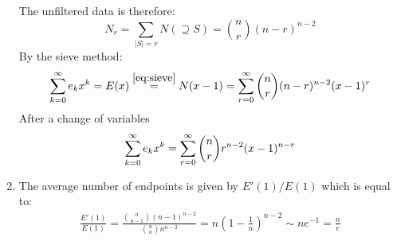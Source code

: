 \begin{solution}
\begin{enumerate}[label=(\alph*)]
        The unfiltered data is therefore:
        \[
            N_r = \sum_{|S| = r} N(\supseteq S) = \binom{n}{r} (n-r)^{n-2}
        \]
        By the sieve method:
        \[
            \bsum[k]  e_k x^k = E(x) \estep{\eqref{eq:sieve}} N(x-1) = \bsum[r] \binom{n}{r} (n-r)^{n-2}(x-1)^r
        \]
        After a change of variables
        \[
            \bsum[k]  e_k x^k = \bsum[r] \binom{n}{r} r^{n-2}(x-1)^{n-r}
        \]
        \item The average number of endpoints is given by $E'(1) / E(1)$ which is equal to:
        \begin{align*}
            \frac{E'(1)}{E(1)} = \frac{\binom{n}{n-1}(n-1)^{n-2}}{\binom{n}{n}n^{n-2}} = n\left(1 - \frac{1}{n}\right)^{n-2}  \sim n e^{-1} = \frac{n}{e}
        \end{align*}
    \end{enumerate}
\end{solution}

